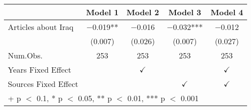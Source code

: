 \begin{table}
\centering
\begin{tabular}[t]{lcccc}
\toprule
  & Model 1 & Model 2 & Model 3 & Model 4\\
\midrule
Articles about Iraq & \num{-0.019}** & \num{-0.016} & \num{-0.032}*** & \num{-0.012}\\
 & (\num{0.007}) & (\num{0.026}) & (\num{0.007}) & (\num{0.027})\\
\midrule
Num.Obs. & \num{253} & \num{253} & \num{253} & \num{253}\\
Years Fixed Effect &  & $\checkmark$ &  & $\checkmark$\\
Sources Fixed Effect &  &  & $\checkmark$ & $\checkmark$\\
\bottomrule
\multicolumn{5}{l}{\rule{0pt}{1em}+ p $<$ 0.1, * p $<$ 0.05, ** p $<$ 0.01, *** p $<$ 0.001}\\
\end{tabular}
\end{table}
